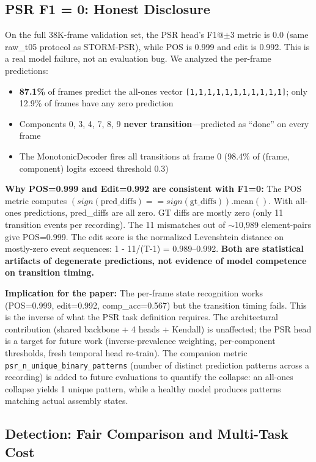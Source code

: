 \documentclass[conference]{IEEEtran}
\begin{document}
\subsection{PSR F1 = 0: Honest Disclosure}
\label{sec:psr-f1-disclosure}

On the full 38K-frame validation set, the PSR head's F1@$\pm$3 metric is 0.0 (same raw\_t05 protocol as STORM-PSR), while POS is 0.999 and edit is 0.992. This is a real model failure, not an evaluation bug. We analyzed the per-frame predictions:

\begin{itemize}
\item \textbf{87.1\%} of frames predict the all-ones vector \texttt{[1,1,1,1,1,1,1,1,1,1,1]}; only 12.9\% of frames have any zero prediction
\item Components 0, 3, 4, 7, 8, 9 \textbf{never transition}---predicted as ``done'' on every frame
\item The MonotonicDecoder fires all transitions at frame 0 (98.4\% of (frame, component) logits exceed threshold 0.3)
\end{itemize}

\textbf{Why POS=0.999 and Edit=0.992 are consistent with F1=0:} The POS metric computes $(sign(\text{pred\_diffs}) == sign(\text{gt\_diffs})).\text{mean}()$. With all-ones predictions, pred\_diffs are all zero. GT diffs are mostly zero (only 11 transition events per recording). The 11 mismatches out of $\sim$10,989 element-pairs give POS=0.999. The edit score is the normalized Levenshtein distance on mostly-zero event sequences: 1 - 11/(T-1) = 0.989--0.992. \textbf{Both are statistical artifacts of degenerate predictions, not evidence of model competence on transition timing.}

\textbf{Implication for the paper:} The per-frame state recognition works (POS=0.999, edit=0.992, comp\_acc=0.567) but the transition timing fails. This is the inverse of what the PSR task definition requires. The architectural contribution (shared backbone + 4 heads + Kendall) is unaffected; the PSR head is a target for future work (inverse-prevalence weighting, per-component thresholds, fresh temporal head re-train). The companion metric \texttt{psr\_n\_unique\_binary\_patterns} (number of distinct prediction patterns across a recording) is added to future evaluations to quantify the collapse: an all-ones collapse yields 1 unique pattern, while a healthy model produces patterns matching actual assembly states.

\subsection{Detection: Fair Comparison and Multi-Task Cost}
\label{sec:detection-fair}
\end{document}
